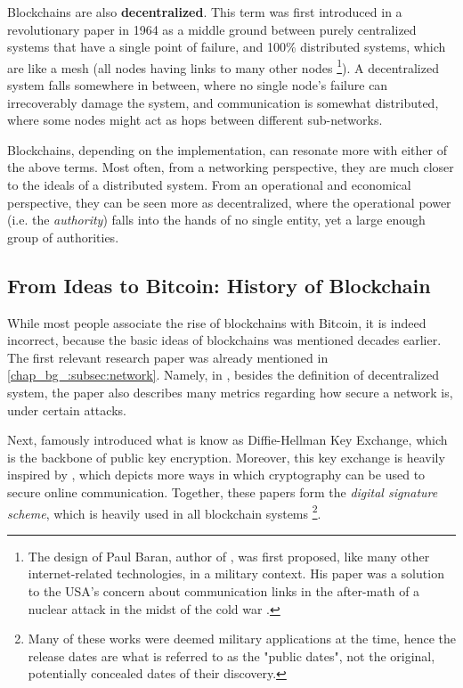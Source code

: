 Blockchains are also \textbf{decentralized}. This term was first introduced in a revolutionary paper
in 1964 as a middle ground between purely centralized systems that have a single point of failure,
and 100\% distributed systems, which are like a mesh (all nodes having links to many other nodes
\cite{baranDistributedCommunicationsNetworks1964} \footnote{The design of Paul Baran, author of
\cite{baranDistributedCommunicationsNetworks1964}, was first proposed, like many other
internet-related technologies, in a military context. His paper was a solution to the USA's concern
about communication links in the after-math of a nuclear attack in the midst of the cold war
\cite{monicaPaulBaranOrigins}.}). A decentralized system falls somewhere in between, where no single
node's failure can irrecoverably damage the system, and communication is somewhat distributed, where
some nodes might act as hops between different sub-networks.

Blockchains, depending on the implementation, can resonate more with either of the above terms. Most
often, from a networking perspective, they are much closer to the ideals of a distributed system.
From an operational and economical perspective, they can be seen more as decentralized, where the
operational power (i.e. the \textit{authority}) falls into the hands of no single entity, yet a
large enough group of authorities.


\subsection{From Ideas to Bitcoin: History of Blockchain} \label{chap_bg_:subsec:hisotry}

While most people associate the rise of blockchains with Bitcoin, it is indeed incorrect, because
the basic ideas of blockchains was mentioned decades earlier. The first relevant research paper was
already mentioned in \ref{chap_bg_:subsec:network}. Namely, in
\cite{baranDistributedCommunicationsNetworks1964}, besides the definition of decentralized system,
the paper also describes many metrics regarding how secure a network is, under certain attacks.

Next, \cite{diffieNewDirectionsCryptography1976} famously introduced what is know as Diffie-Hellman
Key Exchange, which is the backbone of public key encryption. Moreover, this key exchange is heavily
inspired by \cite{merkleSecureCommunicationsInsecure1978}, which depicts more ways in which
cryptography can be used to secure online communication. Together, these papers form the
\textit{digital signature scheme}, which is heavily used in all blockchain systems \footnote{Many of
these works were deemed military applications at the time, hence the release dates are what is
referred to as the "public dates", not the original, potentially concealed dates of their
discovery.}.

